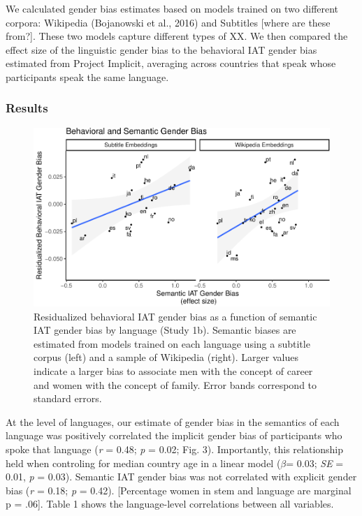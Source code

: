 \documentclass[man,floatsintext]{apa6}
\theoremstyle{definition}
\theoremstyle{definition}
\theoremstyle{definition}
\theoremstyle{remark}
\begin{document}
We calculated gender bias estimates based on models trained on two
different corpora: Wikipedia (Bojanowski et al., 2016) and Subtitles
{[}where are these from?{]}. These two models capture different types of
XX. We then compared the effect size of the linguistic gender bias to
the behavioral IAT gender bias estimated from Project Implicit,
averaging across countries that speak whose participants speak the same
language.

\subsubsection{Results}\label{results}

\begin{figure}
\centering
\includegraphics{iat_lang_files/figure-latex/unnamed-chunk-14-1.pdf}
\caption{\label{fig:unnamed-chunk-14}Residualized behavioral IAT gender bias
as a function of semantic IAT gender bias by language (Study 1b).
Semantic biases are estimated from models trained on each language using
a subtitle corpus (left) and a sample of Wikipedia (right). Larger
values indicate a larger bias to associate men with the concept of
career and women with the concept of family. Error bands correspond to
standard errors.}
\end{figure}

At the level of languages, our estimate of gender bias in the semantics
of each language was positively correlated the implicit gender bias of
participants who spoke that language (\emph{r} = 0.48; \emph{p} = 0.02;
Fig. 3). Importantly, this relationship held when controling for median
country age in a linear model (\(\beta\)= 0.03; \emph{SE} = 0.01,
\emph{p} = 0.03). Semantic IAT gender bias was not correlated with
explicit gender bias (\emph{r} = 0.18; \emph{p} = 0.42). {[}Percentage
women in stem and language are marginal p = .06{]}. Table 1 shows the
language-level correlations between all variables.
\end{document}
